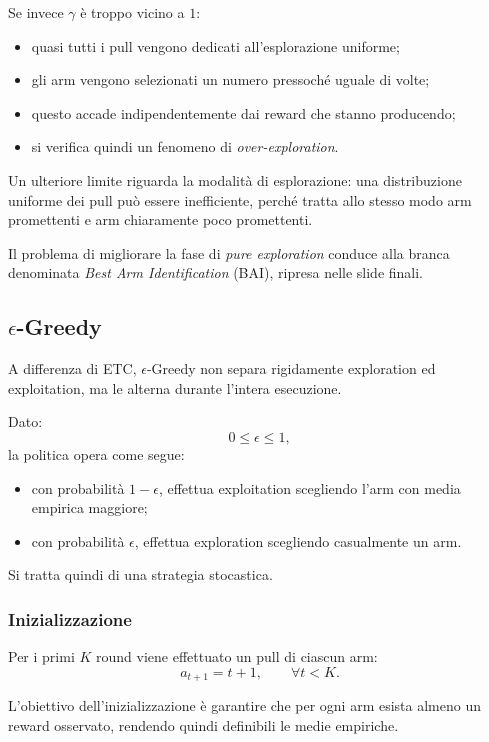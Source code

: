 Se invece $\gamma$ è troppo vicino a $1$:
\begin{itemize}
    \item quasi tutti i pull vengono dedicati all'esplorazione uniforme;
    \item gli arm vengono selezionati un numero pressoché uguale di volte;
    \item questo accade indipendentemente dai reward che stanno producendo;
    \item si verifica quindi un fenomeno di \emph{over-exploration}.
\end{itemize}

Un ulteriore limite riguarda la modalità di esplorazione: una distribuzione uniforme dei pull può essere inefficiente, perché tratta allo stesso modo arm promettenti e arm chiaramente poco promettenti.

Il problema di migliorare la fase di \emph{pure exploration} conduce alla branca denominata \emph{Best Arm Identification} (BAI), ripresa nelle slide finali.


\newpage

\subsection{$\epsilon$-Greedy}

A differenza di ETC, $\epsilon$-Greedy non separa rigidamente exploration ed exploitation, ma le alterna durante l'intera esecuzione.

Dato:
\[
0\leq\epsilon\leq1,
\]
la politica opera come segue:
\begin{itemize}
    \item con probabilità $1-\epsilon$, effettua exploitation scegliendo l'arm con media empirica maggiore;
    \item con probabilità $\epsilon$, effettua exploration scegliendo casualmente un arm.
\end{itemize}

Si tratta quindi di una strategia stocastica.

\subsubsection{Inizializzazione}

Per i primi $K$ round viene effettuato un pull di ciascun arm:
\[
a_{t+1}=t+1,
\qquad \forall t<K.
\]

L'obiettivo dell'inizializzazione è garantire che per ogni arm esista almeno un reward osservato, rendendo quindi definibili le medie empiriche.

